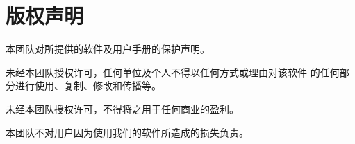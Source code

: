 \chapter{版权声明}
\par 本团队对所提供的软件及用户手册的保护声明。
\par 未经本团队授权许可，任何单位及个人不得以任何方式或理由对该软件
的任何部分进行使用、复制、修改和传播等。
\par 未经本团队授权许可，不得将之用于任何商业的盈利。
\par 本团队不对用户因为使用我们的软件所造成的损失负责。
